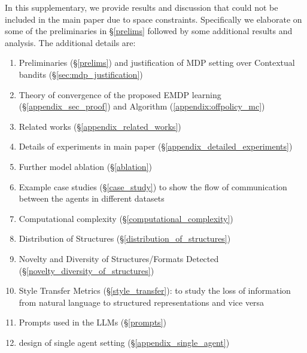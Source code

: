 In this supplementary, we provide results and discussion that could not be included in the main paper due to space constraints. Specifically we elaborate on some of the preliminaries in \S \ref{prelims} followed by some additional results and analysis. The additional details are: 
\begin{enumerate}
    \item Preliminaries (\S \ref{prelims}) and justification of MDP setting over Contextual bandits (\S \ref{sec:mdp_justification})
    \item Theory of convergence of the proposed EMDP learning (\S \ref{appendix_sec_proof}) and \method Algorithm (\ref{appendix:offpolicy_mc})
    \item Related works (\S \ref{appendix_related_works})
    \item Details of experiments in main paper (\S \ref{appendix_detailed_experiments})
    \item Further model ablation (\S \ref{ablation})
    \item Example case studies (\S \ref{case_study}) to show the flow of communication between the agents in different datasets 
    \item Computational complexity (\S \ref{computational_complexity})
    \item Distribution of Structures (\S \ref{distribution_of_structures}) 
    \item Novelty and Diversity of Structures/Formats Detected (\S \ref{novelty_diversity_of_structures}) 
    \item Style Transfer Metrics (\S \ref{style_transfer}): to study the loss of information from natural language to structured representations and vice versa 
    \item Prompts used in the LLMs (\S \ref{prompts})
    \item design of single agent setting (\S \ref{appendix_single_agent})
\end{enumerate}

